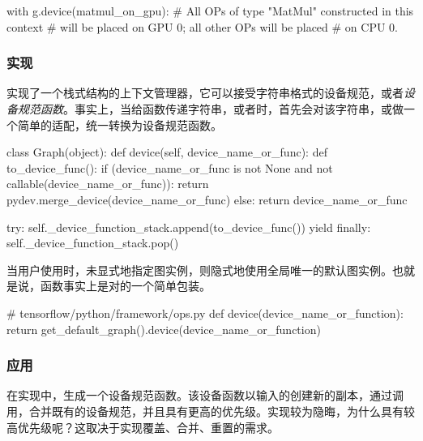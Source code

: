 \begin{content}
\begin{leftbar}
\begin{python}
with g.device(matmul_on_gpu):
  # All OPs of type "MatMul" constructed in this context
  # will be placed on GPU 0; all other OPs will be placed
  # on CPU 0.
\end{python}
\end{leftbar}

\subsubsection{实现}

实现了一个栈式结构的上下文管理器，它可以接受字符串格式的设备规范，或者\emph{设备规范函数}。事实上，当给函数传递字符串，或者时，首先会对该字符串，或做一个简单的适配，统一转换为设备规范函数。

\begin{leftbar}
\begin{python}
class Graph(object):
  def device(self, device_name_or_func):
    def to_device_func():
      if (device_name_or_func is not None
          and not callable(device_name_or_func)):
        return pydev.merge_device(device_name_or_func)
      else:
        return device_name_or_func

    try:
      self._device_function_stack.append(to_device_func())
      yield
    finally:
      self._device_function_stack.pop()
\end{python}
\end{leftbar}

当用户使用时，未显式地指定图实例，则隐式地使用全局唯一的默认图实例。也就是说，函数事实上是对的一个简单包装。

\begin{leftbar}
\begin{python}
# tensorflow/python/framework/ops.py
def device(device_name_or_function):
  return get_default_graph().device(device_name_or_function)
\end{python}
\end{leftbar}

\subsubsection{应用}

在实现中，生成一个设备规范函数。该设备函数以输入的创建新的副本，通过调用，合并既有的设备规范，并且具有更高的优先级。实现较为隐晦，为什么具有较高优先级呢？这取决于实现覆盖、合并、重置的需求。


\end{content}

